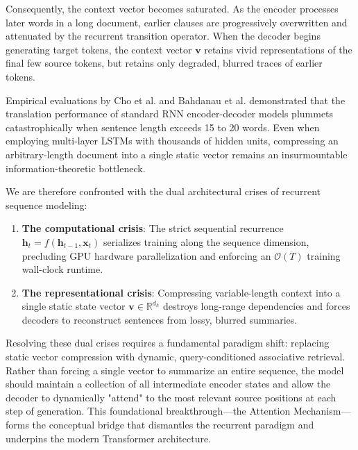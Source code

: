 \documentclass[../../../main.tex]{subfiles}
\begin{document}
Consequently, the context vector becomes saturated. As the encoder processes later words in a long document, earlier clauses are progressively overwritten and attenuated by the recurrent transition operator. When the decoder begins generating target tokens, the context vector $\mathbf{v}$ retains vivid representations of the final few source tokens, but retains only degraded, blurred traces of earlier tokens.

Empirical evaluations by Cho et al. \citep{cho2014} and Bahdanau et al. \citep{bahdanau2014} demonstrated that the translation performance of standard RNN encoder-decoder models plummets catastrophically when sentence length exceeds 15 to 20 words. Even when employing multi-layer LSTMs with thousands of hidden units, compressing an arbitrary-length document into a single static vector remains an insurmountable information-theoretic bottleneck.

We are therefore confronted with the dual architectural crises of recurrent sequence modeling:
\begin{enumerate}
    \item \textbf{The computational crisis}: The strict sequential recurrence $\mathbf{h}_t = f(\mathbf{h}_{t-1}, \mathbf{x}_t)$ serializes training along the sequence dimension, precluding GPU hardware parallelization and enforcing an $\mathcal{O}(T)$ training wall-clock runtime.
    \item \textbf{The representational crisis}: Compressing variable-length context into a single static state vector $\mathbf{v} \in \mathbb{R}^{d_h}$ destroys long-range dependencies and forces decoders to reconstruct sentences from lossy, blurred summaries.
\end{enumerate}

Resolving these dual crises requires a fundamental paradigm shift: replacing static vector compression with dynamic, query-conditioned associative retrieval. Rather than forcing a single vector to summarize an entire sequence, the model should maintain a collection of all intermediate encoder states and allow the decoder to dynamically "attend" to the most relevant source positions at each step of generation. This foundational breakthrough—the Attention Mechanism—forms the conceptual bridge that dismantles the recurrent paradigm and underpins the modern Transformer architecture.

\clearpage\thispagestyle{empty}\null\clearpage
\end{document}
